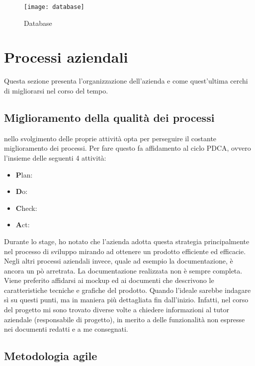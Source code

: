 \begin{figure}[!h] 
	\centering 
	\texttt{[image: database]} 
	\caption{Database}
\end{figure}

\newpage

\section{Processi aziendali}
\label{cap1:Processi aziendali}

Questa sezione presenta l'organizzazione dell'azienda e come quest'ultima cerchi di migliorarsi nel corso del tempo. 

\subsection{Miglioramento della qualità dei processi}
\label{cap1:Miglioramento della qualità dei processi}

\azienda nello svolgimento delle proprie attività opta per perseguire il costante miglioramento dei
processi. Per fare questo fa affidamento al ciclo PDCA, ovvero l'insieme delle seguenti 4 attività:
\begin{itemize}
	\item \textbf{P}lan:
	\item \textbf{D}o:
	\item \textbf{C}heck:
	\item \textbf{A}ct:
\end{itemize}
Durante lo stage, ho notato che l'azienda adotta questa strategia principalmente nel processo di sviluppo mirando ad ottenere un prodotto efficiente ed efficacie. Negli altri processi aziendali invece, quale ad esempio la documentazione, è ancora un pò arretrata. La documentazione realizzata non è sempre completa. Viene preferito affidarsi ai mock\-up ed ai documenti che descrivono le caratteristiche tecniche e grafiche del prodotto. Quando l'ideale sarebbe indagare sì su questi punti, ma in maniera più dettagliata fin dall'inizio. Infatti, nel corso del progetto mi sono trovato diverse volte a chiedere informazioni al tutor aziendale (responsabile di progetto), in merito a delle funzionalità non espresse nei documenti redatti e a me consegnati.  

\subsection{Metodologia agile}
\label{cap1:Metodologia agile}

